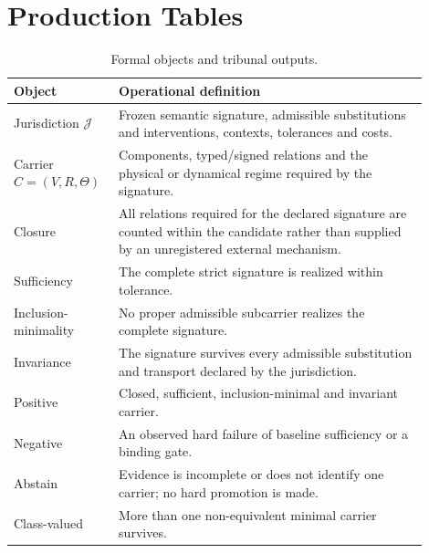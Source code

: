 \clearpage
\section*{Production Tables}

\begin{table}[htbp]
\centering
\small
\caption{Formal objects and tribunal outputs.}
\label{tab:formal-objects}
\begin{tabular}{p{0.20\linewidth}p{0.70\linewidth}}
\toprule
Object & Operational definition \\
\midrule
Jurisdiction $\mathcal J$ & Frozen semantic signature, admissible substitutions and interventions, contexts, tolerances and costs. \\
Carrier $C=(V,R,\Theta)$ & Components, typed/signed relations and the physical or dynamical regime required by the signature. \\
Closure & All relations required for the declared signature are counted within the candidate rather than supplied by an unregistered external mechanism. \\
Sufficiency & The complete strict signature is realized within tolerance. \\
Inclusion-minimality & No proper admissible subcarrier realizes the complete signature. \\
Invariance & The signature survives every admissible substitution and transport declared by the jurisdiction. \\
Positive & Closed, sufficient, inclusion-minimal and invariant carrier. \\
Negative & An observed hard failure of baseline sufficiency or a binding gate. \\
Abstain & Evidence is incomplete or does not identify one carrier; no hard promotion is made. \\
Class-valued & More than one non-equivalent minimal carrier survives. \\
\bottomrule
\end{tabular}
\end{table}

